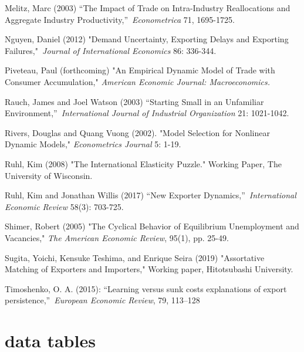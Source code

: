 \documentclass[12pt]{article}
\begin{document}
\begin{description}
\item Melitz, Marc (2003) \textquotedblleft The Impact of Trade on
Intra-Industry Reallocations and Aggregate Industry
Productivity,\textquotedblright\ \textit{Econometrica }71, 1695-1725.

\item Nguyen, Daniel (2012) "Demand Uncertainty, Exporting Delays and
Exporting Failures,"\textit{\ Journal of International Economics }86:
336-344.

\item Piveteau, Paul (forthcoming) "An Empirical Dynamic Model of Trade with
Consumer Accumulation," \textit{American Economic Journal: Macroeconomics.}

\item Rauch, James and Joel Watson (2003) \textquotedblleft Starting Small
in an Unfamiliar Environment,\textquotedblright\ \textit{International
Journal of Industrial Organization} 21: 1021-1042.

\item Rivers, Douglas and Quang Vuong (2002). "Model Selection for Nonlinear
Dynamic Models," \textit{Econometrics Journal} 5: 1-19.

\item Ruhl, Kim (2008) "The International Elasticity Puzzle." Working Paper,
The University of Wisconsin.

\item Ruhl, Kim and Jonathan Willis (2017) \textquotedblleft New Exporter
Dynamics,\textquotedblright\ \textit{International Economic Review} 58(3):
703-725.

\item Shimer, Robert (2005) "The Cyclical Behavior of Equilibrium
Unemployment and Vacancies," \textit{The American Economic Review}, 95(1),
pp. 25-49.

\item Sugita, Yoichi, Kensuke Teshima, and Enrique Seira (2019) "Assortative
Matching of Exporters and Importers," Working paper, Hitotsubashi University.

\item Timoshenko, O. A. (2015): \textquotedblleft Learning versus sunk costs
explanations of export persistence,\textquotedblright\ \textit{European
Economic Review}, 79, 113--128\pagebreak
\end{description}

\appendix

\section{data tables}
\end{document}
